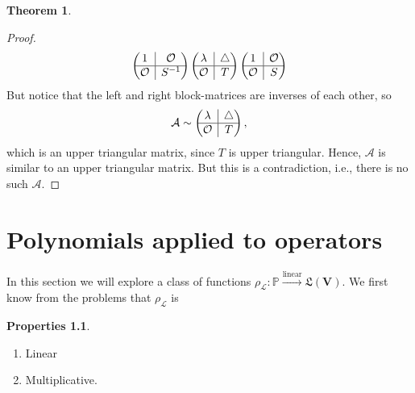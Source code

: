 \documentclass{book}
\theoremstyle{definition}
\newtheorem{prop}{Properties}[section]
\newtheorem{thm}{Theorem}[section]
\newcommand{\V}{\mathbf{V}}
\newcommand{\lag}{\mathcal{L}}
\newcommand{\lin}{\overset{\text{linear}}{\longrightarrow}}
\newcommand{\rvline}{\hspace*{-\arraycolsep}\vline\hspace*{-\arraycolsep}}
\begin{document}
\begin{thm}
\begin{proof}
\begin{align*}
\begin{pmatrix}
		1 & \rvline & \mathcal{O}\\
		\hline
		\mathcal{O} & \rvline & S^{-1}
		\end{pmatrix}
		\begin{pmatrix}
		\lambda & \rvline & \triangle\\
		\hline
		\mathcal{O} & \rvline & T
		\end{pmatrix}
		\begin{pmatrix}
		1 & \rvline & \mathcal{O}\\
		\hline
		\mathcal{O} & \rvline & S
		\end{pmatrix}
		\end{align*}
		But notice that the left and right block-matrices are inverses of each other, so
		\begin{align*}
		\mathcal{A} \sim \begin{pmatrix}
		\lambda & \rvline & \triangle\\
		\hline
		\mathcal{O} & \rvline & T
		\end{pmatrix},
		\end{align*}
		which is an upper triangular matrix, since $T$ is upper triangular. Hence, $\mathcal{A}$ is similar to an upper triangular matrix. But this is a contradiction, i.e., there is no such $\mathcal{A}$. 
	\end{proof}
\end{thm}










\newpage 









\chapter{Polynomials applied to operators}

In this section we will explore a class of functions $\rho_\lag : \mathbb{P} \lin \mathfrak{L}(\V)$.  We first know from the problems that $\rho_\lag$ is 

\begin{prop}
	$\,$
	\begin{enumerate}
		\item Linear
		\item Multiplicative.
	\end{enumerate}
\end{prop}
\end{document}
